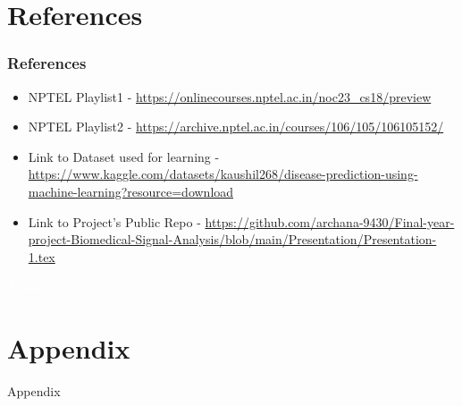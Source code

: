 \documentclass{beamer}
\begin{document}
\section{References}
\begin{frame}[allowframebreaks]
\frametitle{References}\scriptsize
\begin{itemize}
    \item {NPTEL Playlist1 - } \href{https://onlinecourses.nptel.ac.in/noc23_cs18/preview}{https://onlinecourses.nptel.ac.in/noc23_cs18/preview}
    \item {NPTEL Playlist2 - } \href{https://archive.nptel.ac.in/courses/106/105/106105152/}{https://archive.nptel.ac.in/courses/106/105/106105152/}
    \item {Link to Dataset used for learning - } \href{https://www.kaggle.com/datasets/kaushil268/disease-prediction-using-machine-learning?resource=download}{https://www.kaggle.com/datasets/kaushil268/disease-prediction-using-machine-learning?resource=download}
    \item{Link to Project's Public Repo - } \href{https://github.com/archana-9430/Final-year-project-Biomedical-Signal-Analysis/blob/main/Presentation/Presentation-1.tex}{https://github.com/archana-9430/Final-year-project-Biomedical-Signal-Analysis/blob/main/Presentation/Presentation-1.tex}
\end{itemize}


\end{frame}


\begingroup
{
\begin{frame}[c]
\vfill
\begin{center}
\Large\textcolor{white}{Thank you}
\end{center}
\vfill
\end{frame}
} 

\endgroup


\section{Appendix}
\begin{frame}{Appendix}
    
\end{frame}
\end{document}
